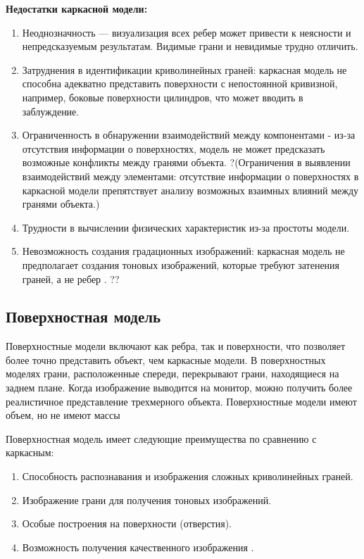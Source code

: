 \textbf{Недостатки каркасной модели:}
\begin{enumerate}
      \item Неоднозначность --- визуализация всех ребер может привести к неясности и непредсказуемым результатам. Видимые грани и невидимые трудно отличить.
      \item Затруднения в идентификации криволинейных граней: каркасная модель не способна адекватно представить поверхности с непостоянной кривизной, например, боковые поверхности цилиндров, что может вводить в заблуждение.
    		\item Ограниченность в обнаружении взаимодействий между компонентами - из-за отсутствия информации о поверхностях, модель не может предсказать возможные конфликты между гранями объекта. ?(Ограничения в выявлении взаимодействий между элементами: отсутствие информации о поверхностях в каркасной модели препятствует анализу возможных взаимных влияний между гранями объекта.)
    \item Трудности в вычислении физических характеристик из-за простоты модели.
   \item Невозможность создания градационных изображений: каркасная модель не предполагает создания тоновых изображений, которые требуют затенения граней, а не ребер \cite{model_geom_01}. ?? %
\end{enumerate}


\subsection{Поверхностная модель}

Поверхностные модели включают как ребра, так и поверхности, что позволяет более точно представить объект, чем каркасные модели. В поверхностных моделях грани, расположенные спереди, перекрывают грани, находящиеся на заднем плане. Когда изображение выводится на монитор, можно получить более реалистичное представление трехмерного объекта. Поверхностные модели имеют объем, но не имеют массы \cite{model_geom}

Поверхностная модель имеет следующие преимущества по сравнению с каркасным:
\begin{enumerate}
\item Способность распознавания и изображения сложных криволинейных граней.
\item Изображение грани для получения тоновых изображений.
\item Особые построения на поверхности (отверстия).
\item Возможность получения качественного изображения \cite{model_geom_01}.
\end{enumerate}


